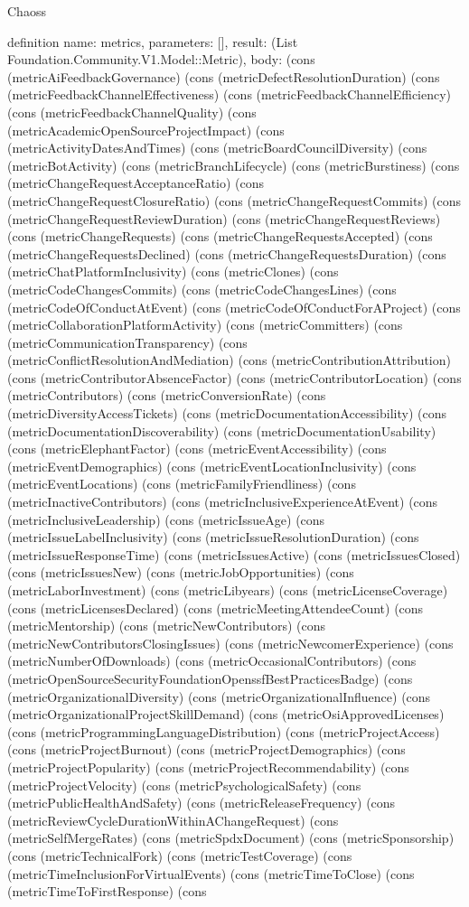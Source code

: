 \begin{lexlean}{Chaoss}
\begin{semanticmodule}
definition{
  name: metrics,
  parameters: [],
  result: (List Foundation.Community.V1.Model::Metric),
  body: (cons (metricAiFeedbackGovernance) (cons (metricDefectResolutionDuration) (cons (metricFeedbackChannelEffectiveness) (cons (metricFeedbackChannelEfficiency) (cons (metricFeedbackChannelQuality) (cons (metricAcademicOpenSourceProjectImpact) (cons (metricActivityDatesAndTimes) (cons (metricBoardCouncilDiversity) (cons (metricBotActivity) (cons (metricBranchLifecycle) (cons (metricBurstiness) (cons (metricChangeRequestAcceptanceRatio) (cons (metricChangeRequestClosureRatio) (cons (metricChangeRequestCommits) (cons (metricChangeRequestReviewDuration) (cons (metricChangeRequestReviews) (cons (metricChangeRequests) (cons (metricChangeRequestsAccepted) (cons (metricChangeRequestsDeclined) (cons (metricChangeRequestsDuration) (cons (metricChatPlatformInclusivity) (cons (metricClones) (cons (metricCodeChangesCommits) (cons (metricCodeChangesLines) (cons (metricCodeOfConductAtEvent) (cons (metricCodeOfConductForAProject) (cons (metricCollaborationPlatformActivity) (cons (metricCommitters) (cons (metricCommunicationTransparency) (cons (metricConflictResolutionAndMediation) (cons (metricContributionAttribution) (cons (metricContributorAbsenceFactor) (cons (metricContributorLocation) (cons (metricContributors) (cons (metricConversionRate) (cons (metricDiversityAccessTickets) (cons (metricDocumentationAccessibility) (cons (metricDocumentationDiscoverability) (cons (metricDocumentationUsability) (cons (metricElephantFactor) (cons (metricEventAccessibility) (cons (metricEventDemographics) (cons (metricEventLocationInclusivity) (cons (metricEventLocations) (cons (metricFamilyFriendliness) (cons (metricInactiveContributors) (cons (metricInclusiveExperienceAtEvent) (cons (metricInclusiveLeadership) (cons (metricIssueAge) (cons (metricIssueLabelInclusivity) (cons (metricIssueResolutionDuration) (cons (metricIssueResponseTime) (cons (metricIssuesActive) (cons (metricIssuesClosed) (cons (metricIssuesNew) (cons (metricJobOpportunities) (cons (metricLaborInvestment) (cons (metricLibyears) (cons (metricLicenseCoverage) (cons (metricLicensesDeclared) (cons (metricMeetingAttendeeCount) (cons (metricMentorship) (cons (metricNewContributors) (cons (metricNewContributorsClosingIssues) (cons (metricNewcomerExperience) (cons (metricNumberOfDownloads) (cons (metricOccasionalContributors) (cons (metricOpenSourceSecurityFoundationOpenssfBestPracticesBadge) (cons (metricOrganizationalDiversity) (cons (metricOrganizationalInfluence) (cons (metricOrganizationalProjectSkillDemand) (cons (metricOsiApprovedLicenses) (cons (metricProgrammingLanguageDistribution) (cons (metricProjectAccess) (cons (metricProjectBurnout) (cons (metricProjectDemographics) (cons (metricProjectPopularity) (cons (metricProjectRecommendability) (cons (metricProjectVelocity) (cons (metricPsychologicalSafety) (cons (metricPublicHealthAndSafety) (cons (metricReleaseFrequency) (cons (metricReviewCycleDurationWithinAChangeRequest) (cons (metricSelfMergeRates) (cons (metricSpdxDocument) (cons (metricSponsorship) (cons (metricTechnicalFork) (cons (metricTestCoverage) (cons (metricTimeInclusionForVirtualEvents) (cons (metricTimeToClose) (cons (metricTimeToFirstResponse) (cons }
\end{semanticmodule}
\end{lexlean}
